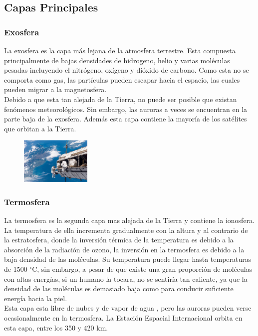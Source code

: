 \documentclass{article} %
\begin{document}
\subsection{Capas Principales}
\subsubsection{Exosfera}
La exosfera es la capa más lejana de la atmosfera terrestre. Esta compuesta principalmente de bajas densidades de hidrogeno, helio y varias moléculas pesadas incluyendo el nitrógeno, oxígeno y dióxido de carbono. Como esta no se comporta como gas, las partículas pueden escapar hacia el espacio, las cuales pueden migrar a la magnetosfera.\\

Debido a que esta tan alejada de la Tierra, no puede ser posible que existan fenómenos meteorológicos. Sin embargo, las auroras a veces se encuentran en la parte baja de la exosfera. Además esta capa contiene la mayoría de los satélites que orbitan a la Tierra.

\begin{figure}
    \centering
    \includegraphics[width=0.3\textwidth]{estacion.jpg}
\end{figure}

\subsubsection{Termosfera}
La termosfera es la segunda capa mas alejada de la Tierra y contiene la ionosfera.  La temperatura de ella incrementa gradualmente con la altura y al contrario de la estratosfera, donde la inversión térmica de la temperatura es debido a la absorción de la radiación de ozono, la inversión en la termosfera es debido a la baja densidad de las moléculas. Su temperatura puede llegar hasta temperaturas de 1500 $^{\circ}$C, sin embargo, a pesar de que existe una gran proporción de moléculas con altas energías, si un humano la tocara, no se sentiría tan caliente, ya que la densidad de las moléculas es demasiado baja como para conducir suficiente energía hacia la piel.\\

Esta capa esta libre de nubes y de vapor de agua , pero las auroras pueden verse ocasionalmente en la termosfera. La Estación Espacial Internacional orbita en esta capa, entre los 350 y 420 km.
\end{document}
